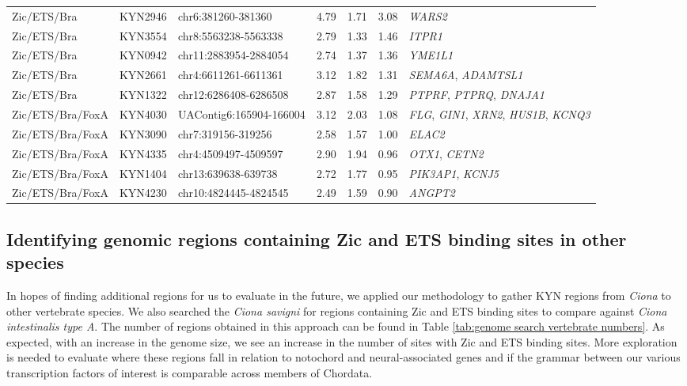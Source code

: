 \begin{small}
\begin{landscape}
\begin{longtable}{l l p{} p{} p{} p{} p{}}
            Zic/ETS/Bra & KYN2946 & chr6:381260-381360 & 4.79 & 1.71 & 3.08 & \textit{WARS2} \\
            Zic/ETS/Bra & KYN3554 & chr8:5563238-5563338 & 2.79 & 1.33 & 1.46 & \textit{ITPR1} \\
            Zic/ETS/Bra & KYN0942 & chr11:2883954-2884054 & 2.74 & 1.37 & 1.36 & \textit{YME1L1} \\
            Zic/ETS/Bra & KYN2661 & chr4:6611261-6611361 & 3.12 & 1.82 & 1.31 & \textit{SEMA6A}, \textit{ADAMTSL1} \\
            Zic/ETS/Bra & KYN1322 & chr12:6286408-6286508 & 2.87 & 1.58 & 1.29 & \textit{PTPRF}, \textit{PTPRQ}, \textit{DNAJA1} \\

            Zic/ETS/Bra/FoxA & KYN4030 & UAContig6:165904-166004 & 3.12 & 2.03 & 1.08 & \textit{FLG}, \textit{GIN1}, \textit{XRN2}, \textit{HUS1B}, \textit{KCNQ3} \\
            Zic/ETS/Bra/FoxA & KYN3090 & chr7:319156-319256 & 2.58 & 1.57 & 1.00 & \textit{ELAC2} \\
            Zic/ETS/Bra/FoxA & KYN4335 & chr4:4509497-4509597 & 2.90 & 1.94 & 0.96 & \textit{OTX1}, \textit{CETN2} \\
            Zic/ETS/Bra/FoxA & KYN1404 & chr13:639638-639738 & 2.72 & 1.77 & 0.95 & \textit{PIK3AP1}, \textit{KCNJ5} \\
            Zic/ETS/Bra/FoxA & KYN4230 & chr10:4824445-4824545 & 2.49 & 1.59 & 0.90 & \textit{ANGPT2} \\
        \end{longtable}
    \end{landscape}
\end{small}

\subsection{Identifying genomic regions containing Zic and ETS binding sites in other species}

In hopes of finding additional regions for us to evaluate in the future, we applied our methodology to gather KYN regions from \textit{Ciona} to other vertebrate species. We also searched the \textit{Ciona savigni} for regions containing Zic and ETS binding sites to compare against \textit{Ciona intestinalis type A}. The number of regions obtained in this approach can be found in Table \ref{tab:genome search vertebrate numbers}. As expected, with an increase in the genome size, we see an increase in the number of sites with Zic and ETS binding sites. More exploration is needed to evaluate where these regions fall in relation to notochord and neural-associated genes and if the grammar between our various transcription factors of interest is comparable across members of Chordata. 

